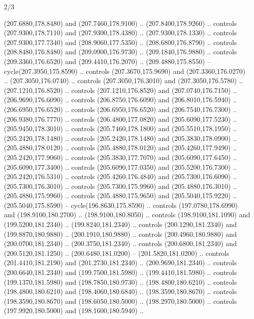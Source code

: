 \begin{flagdescription}{2/3}
\begin{scope}[xshift=0.5\flaglength,yshift=0.5\flagwidth,scale=\flagwidth/259.2]
\begin{scope}[y=0.8pt, x=0.8pt, yscale=-1,shift={(-243,-162)}]
      (207.6880,178.8480) and (207.7460,178.9100) .. (207.8400,178.9260) .. controls
      (207.9300,178.7110) and (207.9300,178.4380) .. (207.9300,178.1330) .. controls
      (207.9300,177.7340) and (208.9060,177.5350) .. (208.6800,176.8790) .. controls
      (208.8480,176.8480) and (209.0900,176.9730) .. (209.1840,176.9880) .. controls
      (209.3360,176.6520) and (209.4410,176.2070) .. (209.4880,175.8550) --
      cycle(207.3950,175.8590) .. controls (207.3670,175.9690) and
      (207.3360,176.0270) .. (207.3050,176.0740) .. controls (207.3050,176.3010) and
      (207.3050,176.5780) .. (207.1210,176.8520) .. controls (207.1210,176.8520) and
      (207.0740,176.7150) .. (206.9690,176.6090) .. controls (206.8750,176.6090) and
      (206.8010,176.5940) .. (206.6950,176.6520) .. controls (206.6950,176.6520) and
      (206.7540,176.7300) .. (206.9380,176.7770) .. controls (206.4800,177.0820) and
      (205.6090,177.5230) .. (205.9450,178.3010) .. controls (205.7460,178.1800) and
      (205.5510,178.1950) .. (205.2420,178.1480) .. controls (205.2420,178.1480) and
      (205.3830,178.0900) .. (205.4880,178.0120) .. controls (205.4880,178.0120) and
      (205.4260,177.9490) .. (205.2420,177.9060) .. controls (205.3830,177.7070) and
      (205.6090,177.6450) .. (205.6090,177.3400) .. controls (205.6090,177.0350) and
      (205.5200,176.7300) .. (205.2420,176.5310) .. controls (205.4260,176.4840) and
      (205.7300,176.6090) .. (205.7300,176.3010) .. controls (205.7300,175.9960) and
      (205.4880,176.3010) .. (205.4880,175.9960) .. controls (205.4880,175.9650) and
      (205.5040,175.9220) .. (205.5040,175.8590) -- cycle(196.8630,175.8590) ..
      controls (197.0780,178.6990) and (198.9100,180.2700) .. (198.9100,180.8050) ..
      controls (198.9100,181.1090) and (199.5200,181.2340) .. (199.8240,181.2340) ..
      controls (200.1290,181.2340) and (199.8870,180.9880) .. (200.1910,180.9880) ..
      controls (200.4960,180.9880) and (200.0700,181.2340) .. (200.3750,181.2340) ..
      controls (200.6800,181.2340) and (200.5120,181.1250) .. (200.6480,181.0200) --
      (201.5820,181.0200) .. controls (201.4410,181.2190) and (201.2730,181.2340) ..
      (200.9690,181.2340) .. controls (200.6640,181.2340) and (199.7500,181.5980) ..
      (199.4410,181.5980) .. controls (199.1370,181.5980) and (198.7850,180.9730) ..
      (198.4800,180.6210) .. controls (198.4800,180.6210) and (198.4060,180.6840) ..
      (198.3590,180.8670) .. controls (198.3590,180.8670) and (198.6050,180.5000) ..
      (198.2970,180.5000) .. controls (197.9920,180.5000) and (198.1600,180.5940) ..

\end{scope}
\end{scope}
\end{flagdescription}
